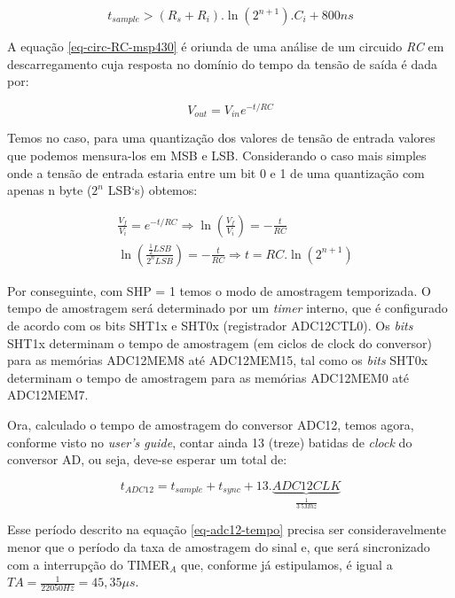 			\begin{equation}
				t_{sample} > (R_s + R_i) . \ln(2^{n+1}). C_i + 800ns
				\label{eq-circ-RC-msp430}
			\end{equation}
			
			A equação \ref{eq-circ-RC-msp430}  é oriunda de uma análise de um circuido \textit{RC} em descarregamento cuja resposta no domínio do tempo da tensão de saída é dada por:
			
			\begin{equation*}
				V_{out} = V_{in}e^{-t/{RC}}
			\end{equation*}
			
			Temos no caso, para uma quantização dos valores de tensão de entrada valores que podemos mensura-los em MSB e LSB. Considerando o caso mais simples onde a tensão de entrada estaria entre um bit 0 e 1 de uma quantização com apenas n byte ($ 2^n $ LSB`s) obtemos:
			
			\begin{equation}
				\begin{aligned}
						&\frac{V_f}{V_i} = e^{-t/{RC}}\Rightarrow \ln\left(\frac{V_f}{V_i}\right) = -\frac{t}{RC}\\
					&\ln\left(\frac{\frac{1}{2}LSB}{2^n LSB}\right) = -\frac{t}{RC}\Rightarrow \boxed{t = RC.\ln(2^{n+1})}
				\end{aligned}
			\end{equation}

			
			Por conseguinte, com SHP = 1 temos o modo de amostragem temporizada. O tempo de amostragem será determinado por um \textit{timer} interno, que é configurado de acordo com os bits SHT1x e SHT0x (registrador ADC12CTL0). Os \textit{bits} SHT1x determinam o tempo de amostragem (em ciclos de clock do conversor) para as memórias ADC12MEM8 até ADC12MEM15, tal como os \textit{bits} SHT0x determinam o tempo de amostragem para as memórias ADC12MEM0 até ADC12MEM7.
			
			Ora, calculado o tempo de amostragem do conversor ADC12, temos agora, conforme visto no \textit{user's guide}, contar ainda 13 (treze) batidas de \textit{clock} do conversor AD, ou seja, deve-se esperar um total de:
			
			\begin{equation}
				t_{ADC12} = t_{sample} + t_{sync} + 13.\underbrace{ADC12CLK}_{\frac{1}{3~5Mhz}}
				\label{eq-adc12-tempo}
			\end{equation}
			
			Esse período descrito na equação \ref{eq-adc12-tempo} precisa ser consideravelmente menor que o período da taxa de amostragem do sinal e, que será sincronizado com a interrupção do TIMER$_A$ que, conforme já estipulamos, é igual a $ TA = \frac{1}{22050 Hz} = 45,35\mu s $.
			
